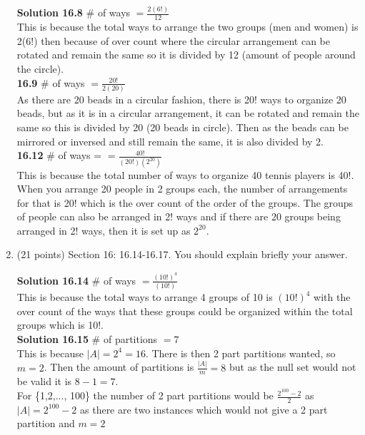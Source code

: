 \documentclass[12pt]{article}
\begin{document}
\begin{enumerate}
\textbf{Solution 16.8}
 \# of ways $ = \frac{2(6!)}{12}$ \\ 
 This is because the total ways to arrange the two groups (men and women) is 2(6!) then because of over count where the circular arrangement can be rotated and remain the same so it is divided by 12 (amount of people around the circle). \\ 
 
\textbf{16.9}
 \# of ways $= \frac{20!}{2(20)}$ \\
 As there are 20 beads in a circular fashion, there is 20! ways to organize 20 beads, but as it is in a circular arrangement, it can be rotated and remain the same so this is divided by 20 (20 beads in circle). Then as the beads can be mirrored or inversed and still remain the same, it is also divided by 2. \\

\textbf{16.12} \# of ways = $= \frac{40!}{(20!)(2^{20})}$ \\ 
This is because the total number of ways to organize 40 tennis players is 40!. When you arrange 20 people in 2 groups each, the number of arrangements for that is 20! which is the over count of the order of the groups. The groups of people can also be arranged in 2! ways and if there are 20 groups being arranged in 2! ways, then it is set up as $2^{20}$. \\ 

\item (21 points) Section 16:  16.14-16.17.  You should explain briefly your answer.  

\textbf{Solution 16.14} \# of ways $=  \frac{(10!)^4}{(10!)}$ \\ 
This is because the total ways to arrange 4 groups of 10 is $(10!)^4$ with the over count of the ways that these groups could be organized within the total groups which is 10!. \\


\textbf{Solution 16.15} \# of partitions $= 7$ \\ 
This is because $|A| = 2^4 = 16$. There is then 2 part partitions wanted, so $m = 2$. Then the amount of partitions is $\frac{|A|}{m} = 8$ but as the null set would not be valid it is $8-1 = 7$. \\ 

For \{1,2,..., 100\} the number of 2 part partitions would be $\frac{2^{100} - 2}{2}$ as $|A| = 2^{100} - 2$ as there are two instances which would not give a 2 part partition and $m = 2$ \\


\end{enumerate}
\end{document}
